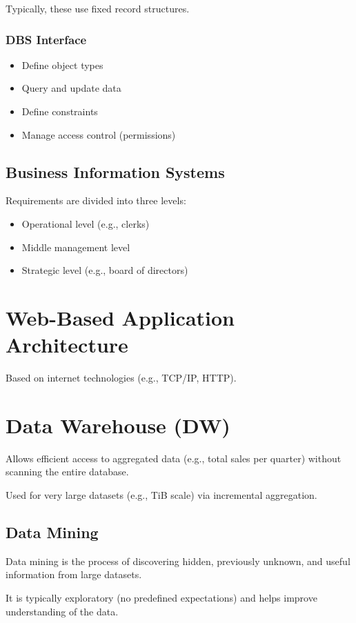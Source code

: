 \documentclass{article}
\begin{document}
Typically, these use fixed record structures.

\subsubsection{DBS Interface}
\begin{itemize}
  \item Define object types
  \item Query and update data
  \item Define constraints
  \item Manage access control (permissions)
\end{itemize}

\subsection{Business Information Systems}
Requirements are divided into three levels:
\begin{itemize}
  \item Operational level (e.g., clerks)
  \item Middle management level
  \item Strategic level (e.g., board of directors)
\end{itemize}

\section{Web-Based Application Architecture}
Based on internet technologies (e.g., TCP/IP, HTTP).

\section{Data Warehouse (DW)}
Allows efficient access to aggregated data (e.g., total sales per quarter) without scanning the entire database.

Used for very large datasets (e.g., TiB scale) via incremental aggregation.

\subsection{Data Mining}
Data mining is the process of discovering hidden, previously unknown, and useful information from large datasets.

It is typically exploratory (no predefined expectations) and helps improve understanding of the data.
\end{document}
